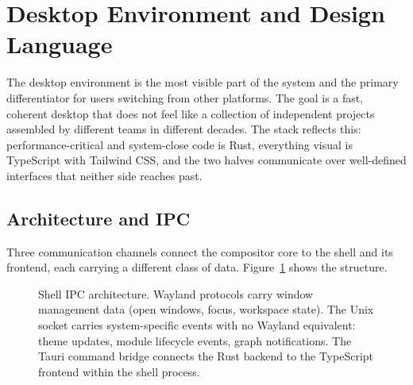 \section{Desktop Environment and Design Language}
\label{sec:desktop}

The desktop environment is the most visible part of the system and the primary
differentiator for users switching from other platforms. The goal is a fast,
coherent desktop that does not feel like a collection of independent projects
assembled by different teams in different decades. The stack reflects this:
performance-critical and system-close code is Rust, everything visual is
TypeScript with Tailwind CSS, and the two halves communicate over well-defined
interfaces that neither side reaches past.

\subsection{Architecture and IPC}
\label{sec:desktop-ipc}

Three communication channels connect the compositor core to the shell and its
frontend, each carrying a different class of data. Figure~\ref{fig:shell-ipc}
shows the structure.

\begin{figure}[htbp]
\centering
{}
\caption{Shell IPC architecture. Wayland protocols carry window management data
(open windows, focus, workspace state). The Unix socket carries system-specific
events with no Wayland equivalent: theme updates, module lifecycle events,
graph notifications. The Tauri command bridge connects the Rust backend to the
TypeScript frontend within the shell process.}
\label{fig:shell-ipc}
\end{figure}

